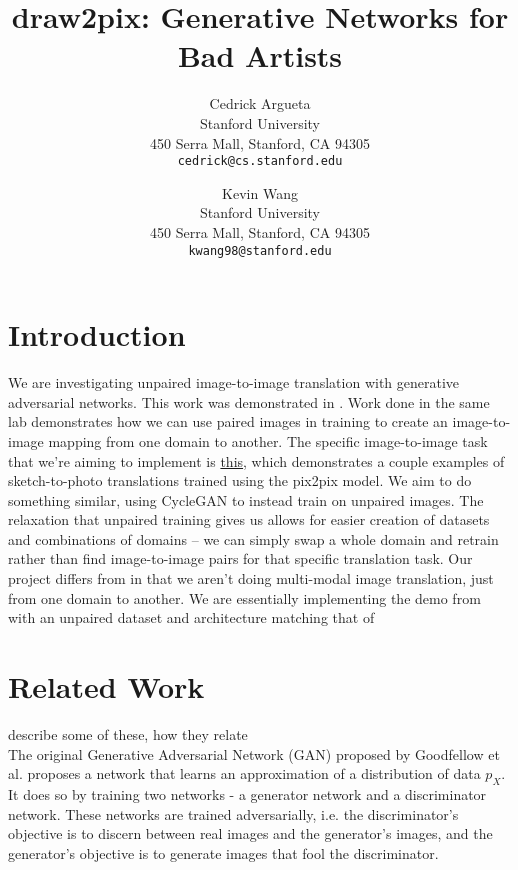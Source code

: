 \documentclass[10pt,twocolumn,letterpaper]{article}
\begin{document}
\title{draw2pix: Generative Networks for Bad Artists}

\author{Cedrick Argueta\\
Stanford University\\
450 Serra Mall, Stanford, CA 94305\\
{\tt\small cedrick@cs.stanford.edu}
\and
Kevin Wang\\
Stanford University\\
450 Serra Mall, Stanford, CA 94305\\
{\tt\small kwang98@stanford.edu}
}

\maketitle

\section{Introduction}
We are investigating unpaired image-to-image translation with generative adversarial networks.
This work was demonstrated in \cite{cycleGAN}.
Work done in the same lab \cite{pix2pix} demonstrates how we can use paired images in training to create an image-to-image mapping from one domain to another.
The specific image-to-image task that we're aiming to implement is \href{https://affinelayer.com/pixsrv/}{this}, which demonstrates a couple examples of sketch-to-photo translations trained using the pix2pix model.
We aim to do something similar, using CycleGAN to instead train on unpaired images.
The relaxation that unpaired training gives us allows for easier creation of datasets and combinations of domains -- we can simply swap a whole domain and retrain rather than find image-to-image pairs for that specific translation task.
Our project differs from \cite{bicyclegan} in that we aren't doing multi-modal image translation, just from one domain to another. 
We are essentially implementing the demo from \cite{pix2pix} with an unpaired dataset and architecture matching that of \cite{cycleGAN}

\section{Related Work}
describe some of these, how they relate \\
The original Generative Adversarial Network (GAN) proposed by Goodfellow et al. \cite{gan}  proposes a network that learns an approximation of a distribution of data $p_{X}$.
It does so by training two networks - a generator network and a discriminator network.
These networks are trained adversarially, i.e. the discriminator's objective is to discern between real images and the generator's images, and the generator's objective is to generate images that fool the discriminator.
\end{document}
